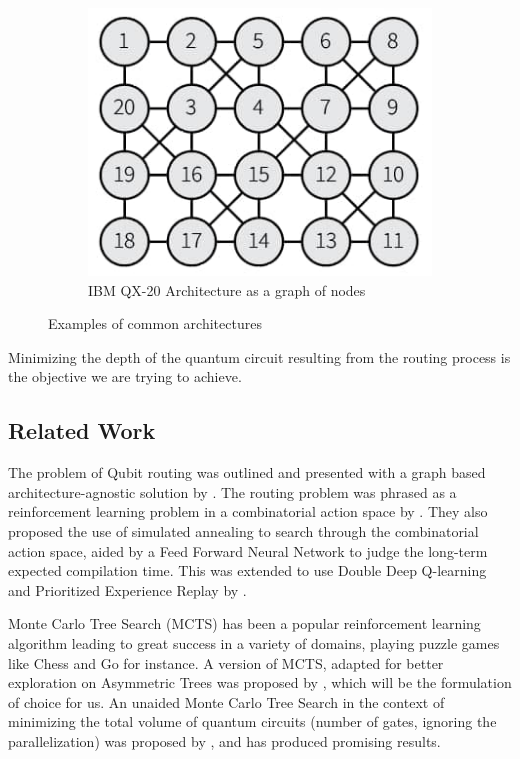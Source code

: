 \documentclass[%
 reprint,
 amsmath,amssymb,
 aps,
]{revtex4-2}
\begin{document}
\begin{figure}
\begin{subfigure}[b]{0.56\linewidth}
        \includegraphics[width=\linewidth]{images/device-ibmqx.jpg}
        \caption{IBM QX-20 Architecture as a graph of nodes}
    \end{subfigure}
    \caption{Examples of common architectures}
    \label{fig:topology-example}
\end{figure}

Minimizing the depth of the quantum circuit resulting from the routing process is the objective we are trying to achieve.


\subsection{\label{sec:intro-related}Related Work}

The problem of Qubit routing was outlined and presented with a graph based architecture-agnostic solution by \citet{qroute_tket}. The routing problem was phrased as a reinforcement learning problem in a combinatorial action space by \citet{qroute_dqn1}. They also proposed the use of simulated annealing to search through the combinatorial action space, aided by a Feed Forward Neural Network to judge the long-term expected compilation time. This was extended to use Double Deep Q-learning and Prioritized Experience Replay by \citet{qroute_dqn2}.

Monte Carlo Tree Search (MCTS) has been a popular reinforcement learning algorithm \citep{mcts_bandits_0, mcts_bandits_1, mcts_uct} leading to great success in a variety of domains, playing puzzle games like Chess and Go \citep{mcts_alphago} for instance.
A version of MCTS, adapted for better exploration on Asymmetric Trees was proposed by \citet{mcts_assymetric}, which will be the formulation of choice for us.
An unaided Monte Carlo Tree Search in the context of minimizing the total volume of quantum circuits (number of gates, ignoring the parallelization) was proposed by \citet{qroute_mcts}, and has produced promising results.
\end{document}

